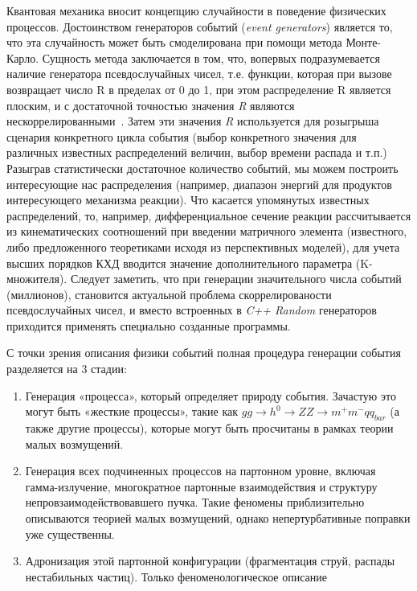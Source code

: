 Квантовая механика вносит концепцию случайности в
поведение физических процессов. Достоинством
генераторов событий (\textit{event generators}) является то, что эта
случайность может быть смоделирована при помощи метода
Монте-Карло. Сущность метода заключается в том, что, вопервых подразумевается наличие генератора
псевдослучайных чисел, т.е. функции, которая при вызове
возвращает число R в пределах от 0 до 1, при этом
распределение R является плоским, и с достаточной
точностью значения \textit{R} являются нескоррелированными~\cite{review-pythia}.
Затем эти значения \textit{R} используется для розыгрыша сценария
конкретного цикла события (выбор конкретного значения
для различных известных распределений величин, выбор
времени распада и т.п.) Разыграв статистически достаточное
количество событий, мы можем построить интересующие
нас распределения (например, диапазон энергий для
продуктов интересующего механизма реакции).
Что касается упомянутых известных распределений,
то, например, дифференциальное сечение реакции
рассчитывается из кинематических соотношений при
введении матричного элемента (известного, либо
предложенного теоретиками исходя из перспективных
моделей), для учета высших порядков КХД вводится
значение дополнительного параметра (K-множителя).
Следует заметить, что при генерации значительного
числа событий (миллионов), становится актуальной
проблема скоррелированости псевдослучайных чисел, и
вместо встроенных в \textit{C++ Random} генераторов приходится
применять специально созданные программы.


С точки зрения описания физики событий полная
процедура генерации события разделяется на 3 стадии:

\begin{enumerate}
	\item Генерация «процесса», который определяет природу
	события. Зачастую это могут быть «жесткие процессы»,
	такие как $gg \rightarrow {h}^{0} \rightarrow ZZ \rightarrow {m}^{+}{m}^{-}{qq}_{bar}$ (а также другие
	процессы), которые могут быть просчитаны в рамках
	теории малых возмущений.

	\item Генерация всех подчиненных процессов на партонном
	уровне, включая гамма-излучение, многократное партонные
	взаимодействия и структуру непровзаимодействовавшего
	пучка. Такие феномены приблизительно описываются
	теорией малых возмущений, однако непертурбативные
	поправки уже существенны.
	\item Адронизация этой партонной конфигурации
	(фрагментация струй, распады нестабильных частиц).
	Только феноменологическое описание
\end{enumerate}

